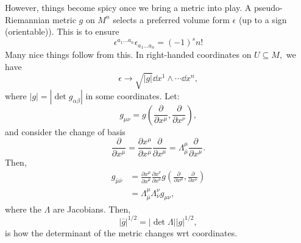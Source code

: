 \documentclass{article}
\numberwithin{equation}{section}
\begin{document}
However, things become spicy once we bring a metric into play. A pseudo-Riemannian metric $g$ on $M^n$ selects a preferred volume form $\epsilon$ (up to a sign (orientable)). This is to ensure 
\begin{equation*}
    \epsilon^{a_1\dots a_n}\epsilon_{a_1\dots a_n} = (-1)^s n!
\end{equation*}
Many nice things follow from this. In right-handed coordinates on $U \subseteq M,$ we have 
\begin{equation*}
    \epsilon \to \sqrt{|g|} \dd{x}^1 \wedge \cdots \dd{x}^n,
\end{equation*}
where $|g| = |\det g_{\alpha\beta}|$ in some coordinates. Let:
\begin{equation*}
    g_{\mu\nu} = g\left(\frac{\partial}{\partial x^\mu}, \frac{\partial}{\partial x^\nu}\right),
\end{equation*}
and consider the change of basis 
\begin{equation*}
    \frac{\partial}{\partial x^{\bar{\mu}}} = \frac{\partial x^\mu}{\partial x^{\bar{\mu}}} \frac{\partial}{\partial x^\mu} = \Lambda^{\mu}_{\bar{\mu}} \frac{\partial}{\partial x^\mu}.
\end{equation*}
Then,
\begin{align*}
    g_{\bar{\mu}\bar{\nu}} &= \frac{\partial x^{\mu}}{\partial x^{\bar{\mu}}}\frac{\partial x^{\nu}}{\partial x^{\bar{\nu}}}g\left(\frac{\partial}{\partial x^\mu}, \frac{\partial}{\partial x^\nu}\right) \\ 
    &= \Lambda^{\mu}_{\bar{\mu}} \Lambda^{\nu}_{\bar{\nu}} g_{\mu\nu},
\end{align*}
where the $\Lambda$ are Jacobians. Then,
\begin{equation*}
    |\bar{g}|^{1/2} = |\det \Lambda | |g|^{1/2},
\end{equation*}
is how the determinant of the metric changes wrt coordinates.
\end{document}
